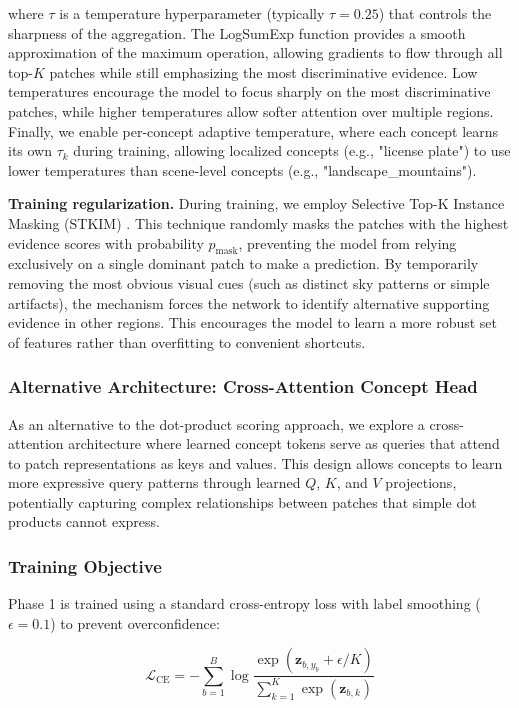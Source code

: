 \documentclass{article}
\newcommand{\logits}{\mathbf{z}}
\begin{document}
where $\tau$ is a temperature hyperparameter (typically $\tau = 0.25$) that controls the sharpness of the aggregation. The LogSumExp function provides a smooth approximation of the maximum operation, allowing gradients to flow through all top-$K$ patches while still emphasizing the most discriminative evidence. Low temperatures encourage the model to focus sharply on the most discriminative patches, while higher temperatures allow softer attention over multiple regions. Finally, we enable per-concept adaptive temperature, where each concept learns its own $\tau_k$ during training, allowing localized concepts (e.g., "license plate") to use lower temperatures than scene-level concepts (e.g., "landscape\_mountains").

\textbf{Training regularization.} During training, we employ Selective Top-K Instance Masking (STKIM) \cite{STKIM}. This technique randomly masks the patches with the highest evidence scores with probability $p_{\text{mask}}$, preventing the model from relying exclusively on a single dominant patch to make a prediction. By temporarily removing the most obvious visual cues (such as distinct sky patterns or simple artifacts), the mechanism forces the network to identify alternative supporting evidence in other regions. This encourages the model to learn a more robust set of features rather than overfitting to convenient shortcuts.


\subsubsection{Alternative Architecture: Cross-Attention Concept Head}

As an alternative to the dot-product scoring approach, we explore a cross-attention architecture where learned concept tokens serve as queries that attend to patch representations as keys and values. This design allows concepts to learn more expressive query patterns through learned $Q$, $K$, and $V$ projections, potentially capturing complex relationships between patches that simple dot products cannot express.

\subsubsection{Training Objective}

Phase 1 is trained using a standard cross-entropy loss with label smoothing ($\epsilon = 0.1$) to prevent overconfidence:

\begin{equation}
\mathcal{L}_{\text{CE}} = -\sum_{b=1}^{B} \log \frac{\exp(\logits_{b,y_b} + \epsilon/K)}{\sum_{k=1}^{K} \exp(\logits_{b,k})}
\end{equation}
\end{document}
